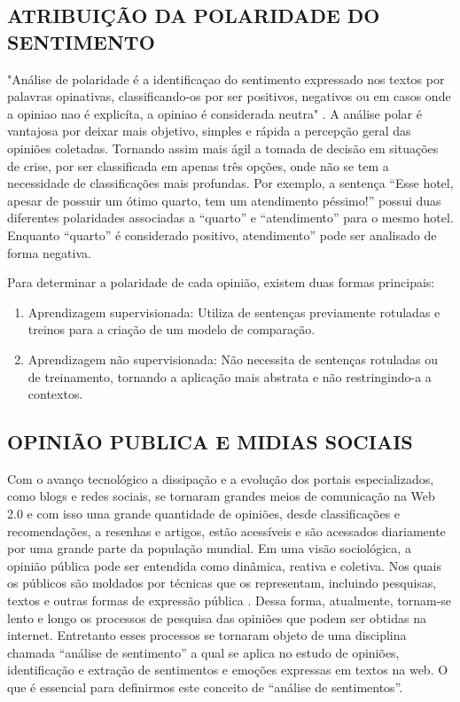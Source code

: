 \documentclass[12pt, a4paper]{article}
\begin{document}
\subsection{ATRIBUIÇÃO DA POLARIDADE DO SENTIMENTO}
"Análise de polaridade é a identificaçao do sentimento expressado nos textos por palavras opinativas, classificando-os por ser positivos, negativos ou em casos onde a opiniao nao é explicíta, a opiniao é considerada neutra" \cite{Robson}. A análise polar é vantajosa por deixar mais objetivo, simples e rápida a percepção geral das opiniões coletadas. Tornando assim mais ágil a tomada de decisão em situações de crise, por ser classificada em apenas três opções, onde não se tem a necessidade de classificações mais profundas.  Por exemplo, a sentença “Esse hotel, apesar de possuir um ótimo quarto, tem um atendimento péssimo!” possui duas diferentes polaridades associadas a “quarto” e “atendimento” para o mesmo hotel. Enquanto “quarto” é considerado positivo, atendimento” pode ser analisado de forma negativa. 

\bigskip
Para determinar a polaridade de cada opinião, existem duas formas principais:

\medskip
\begin{enumerate}
\item Aprendizagem supervisionada: Utiliza de sentenças previamente rotuladas e treinos para a criação de um modelo de comparação. \cite{Robson}
\item Aprendizagem não supervisionada: Não necessita de sentenças rotuladas ou de treinamento, tornando a aplicação mais abstrata e não restringindo-a a contextos. \cite{Robson}
\end{enumerate}

\subsection{OPINIÃO PUBLICA E MIDIAS SOCIAIS}
\hspace*{0.8cm}Com o avanço tecnológico a dissipação e a evolução dos portais especializados, como blogs e redes sociais, se tornaram grandes meios de comunicação na Web 2.0 e com isso uma grande quantidade de opiniões, desde classificações e recomendações, a resenhas e artigos, estão acessíveis e são acessados diariamente por uma grande parte da população mundial. Em uma visão sociológica, a opinião pública pode ser entendida como dinâmica, reativa e coletiva. Nos quais os públicos são moldados por técnicas que os representam, incluindo pesquisas, textos e outras formas de expressão pública \cite{Perrin}. Dessa forma, atualmente, tornam-se lento e longo os processos de pesquisa das opiniões que podem ser obtidas na internet. Entretanto esses processos se tornaram objeto de uma disciplina chamada “análise de sentimento” a qual se aplica no estudo de opiniões, identificação e extração de sentimentos e emoções expressas em textos na web. O que é essencial para definirmos este conceito de “análise de sentimentos”.
\end{document}

